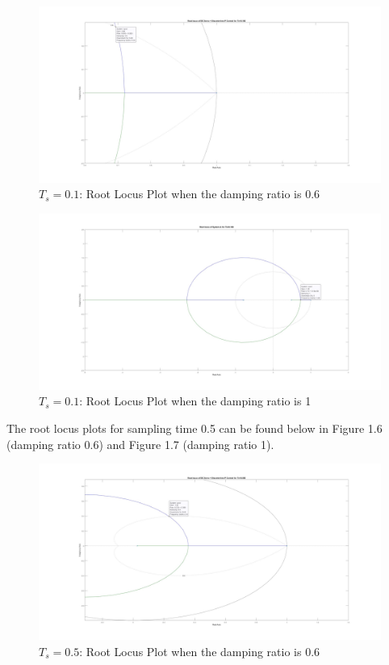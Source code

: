 \documentclass[stu, a4paper, 12pt, floatsintext]{apa7}
\numberwithin{figure}{section}
\numberwithin{table}{section}
\numberwithin{equation}{section}
\begin{document}
\begin{figure}[H]
    \caption{$T_s = 0.1$: Root Locus Plot when the damping ratio is 0.6}
    \label{fig:0.1_Ts_damping_0.6}
    \centering
    \includegraphics[width=1.1\textwidth]{pictures/task2_0.1_damping_0.6.jpg}
\end{figure}
\begin{figure}[H]
    \caption{$T_s = 0.1$: Root Locus Plot when the damping ratio is 1}
    \label{fig:0.1_Ts_damping_1}
    \centering
    \includegraphics[width=1.1\textwidth]{pictures/task2_0.1_damping_1.jpg}
\end{figure}
The root locus plots for sampling time 0.5 can be found below in Figure 1.6 (damping ratio 0.6) and Figure 1.7 (damping ratio 1). 
\begin{figure}[H]
    \caption{$T_s = 0.5$: Root Locus Plot when the damping ratio is 0.6}
    \label{fig:0.5_Ts_damping_0.6}
    \centering
    \includegraphics[width=1.1\textwidth]{pictures/task2_0.5_damping_0.6.jpg}
\end{figure}
\end{document}
